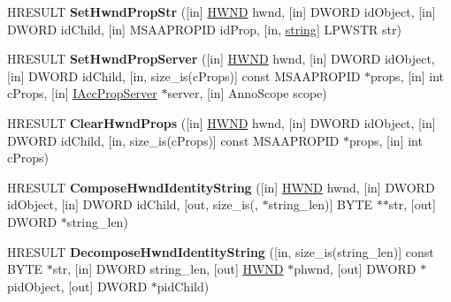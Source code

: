 \begin{DoxyCompactItemize}
H\+R\+E\+S\+U\+LT {\bfseries Set\+Hwnd\+Prop\+Str} (\mbox{[}in\mbox{]} \hyperlink{interfacevoid}{H\+W\+ND} hwnd, \mbox{[}in\mbox{]} D\+W\+O\+RD id\+Object, \mbox{[}in\mbox{]} D\+W\+O\+RD id\+Child, \mbox{[}in\mbox{]} M\+S\+A\+A\+P\+R\+O\+P\+ID id\+Prop, \mbox{[}in, \hyperlink{structstring}{string}\mbox{]} L\+P\+W\+S\+TR str)
\item 
\mbox{\label{interface_i_acc_prop_services_a75781f06ba60ad147ae5849fc97fcd11}} 
H\+R\+E\+S\+U\+LT {\bfseries Set\+Hwnd\+Prop\+Server} (\mbox{[}in\mbox{]} \hyperlink{interfacevoid}{H\+W\+ND} hwnd, \mbox{[}in\mbox{]} D\+W\+O\+RD id\+Object, \mbox{[}in\mbox{]} D\+W\+O\+RD id\+Child, \mbox{[}in, size\+\_\+is(c\+Props)\mbox{]} const M\+S\+A\+A\+P\+R\+O\+P\+ID $\ast$props, \mbox{[}in\mbox{]} int c\+Props, \mbox{[}in\mbox{]} \hyperlink{interface_i_acc_prop_server}{I\+Acc\+Prop\+Server} $\ast$server, \mbox{[}in\mbox{]} Anno\+Scope scope)
\item 
\mbox{\label{interface_i_acc_prop_services_a35c3233676b5f902bc650c22ba8153c8}} 
H\+R\+E\+S\+U\+LT {\bfseries Clear\+Hwnd\+Props} (\mbox{[}in\mbox{]} \hyperlink{interfacevoid}{H\+W\+ND} hwnd, \mbox{[}in\mbox{]} D\+W\+O\+RD id\+Object, \mbox{[}in\mbox{]} D\+W\+O\+RD id\+Child, \mbox{[}in, size\+\_\+is(c\+Props)\mbox{]} const M\+S\+A\+A\+P\+R\+O\+P\+ID $\ast$props, \mbox{[}in\mbox{]} int c\+Props)
\item 
\mbox{\label{interface_i_acc_prop_services_a1b630f0c2ee2984ff09cd3d2d65bf318}} 
H\+R\+E\+S\+U\+LT {\bfseries Compose\+Hwnd\+Identity\+String} (\mbox{[}in\mbox{]} \hyperlink{interfacevoid}{H\+W\+ND} hwnd, \mbox{[}in\mbox{]} D\+W\+O\+RD id\+Object, \mbox{[}in\mbox{]} D\+W\+O\+RD id\+Child, \mbox{[}out, size\+\_\+is(, $\ast$string\+\_\+len)\mbox{]} B\+Y\+TE $\ast$$\ast$str, \mbox{[}out\mbox{]} D\+W\+O\+RD $\ast$string\+\_\+len)
\item 
\mbox{\label{interface_i_acc_prop_services_ad8cc8045463d48d39780574352f3582f}} 
H\+R\+E\+S\+U\+LT {\bfseries Decompose\+Hwnd\+Identity\+String} (\mbox{[}in, size\+\_\+is(string\+\_\+len)\mbox{]} const B\+Y\+TE $\ast$str, \mbox{[}in\mbox{]} D\+W\+O\+RD string\+\_\+len, \mbox{[}out\mbox{]} \hyperlink{interfacevoid}{H\+W\+ND} $\ast$phwnd, \mbox{[}out\mbox{]} D\+W\+O\+RD $\ast$pid\+Object, \mbox{[}out\mbox{]} D\+W\+O\+RD $\ast$pid\+Child)
$$
\end{DoxyCompactItemize}
